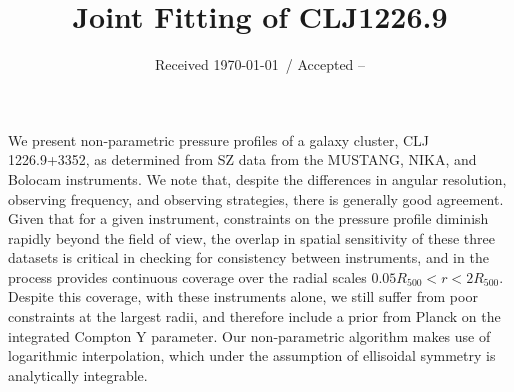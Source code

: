 \documentclass[twocolumn,traditabstract]{aa}
\begin{document}
\title{Joint Fitting of CLJ1226.9}

\date{Received \today \ / Accepted --}



\abstract
    {We present non-parametric pressure profiles of a galaxy cluster, CLJ 1226.9+3352, as
      determined from SZ data from the MUSTANG, NIKA, and Bolocam instruments.
      We note that, despite the differences in angular resolution,
      observing frequency, and observing strategies, there is generally good agreement.
      Given that for a given instrument, constraints on the pressure profile
      diminish rapidly beyond the field of view, the overlap in spatial sensitivity
      of these three datasets is critical in checking for consistency between instruments,
      and in the process provides continuous coverage over the radial scales
      $0.05 R_{500} < r < 2 R_{500}$. Despite this coverage, with these instruments alone, we
      still suffer from poor constraints at the largest radii, and therefore include a prior
      from Planck on the integrated Compton Y parameter. Our non-parametric algorithm makes
      use of logarithmic interpolation, which under the assumption of ellisoidal symmetry is
      analytically integrable.}


\maketitle
\end{document}
